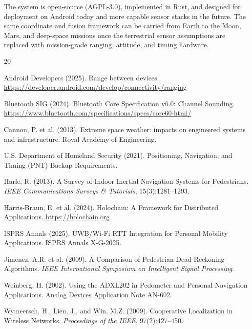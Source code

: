 \documentclass[12pt,a4paper]{article}
\begin{document}
The system is open-source (AGPL-3.0), implemented in Rust, and designed for deployment on Android today and more capable sensor stacks in the future. The same coordinate and fusion framework can be carried from Earth to the Moon, Mars, and deep-space missions once the terrestrial sensor assumptions are replaced with mission-grade ranging, attitude, and timing hardware.



\begin{thebibliography}{20}

Android Developers (2025).
\newblock Range between devices.
\newblock \url{https://developer.android.com/develop/connectivity/ranging}

Bluetooth SIG (2024).
\newblock Bluetooth Core Specification v6.0: Channel Sounding.
\newblock \url{https://www.bluetooth.com/specifications/specs/core60-html/}

Cannon, P. et al. (2013).
\newblock Extreme space weather: impacts on engineered systems and infrastructure.
\newblock Royal Academy of Engineering.

U.S. Department of Homeland Security (2021).
\newblock Positioning, Navigation, and Timing (PNT) Backup Requirements.

Harle, R. (2013).
\newblock A Survey of Indoor Inertial Navigation Systems for Pedestrians.
\newblock \emph{IEEE Communications Surveys \& Tutorials}, 15(3):1281--1293.

Harris-Braun, E. et al. (2024).
\newblock Holochain: A Framework for Distributed Applications.
\newblock \url{https://holochain.org}

ISPRS Annals (2025).
\newblock UWB/Wi-Fi RTT Integration for Personal Mobility Applications.
\newblock ISPRS Annals X-G-2025.

Jimenez, A.R. et al. (2009).
\newblock A Comparison of Pedestrian Dead-Reckoning Algorithms.
\newblock \emph{IEEE International Symposium on Intelligent Signal Processing}.

Weinberg, H. (2002).
\newblock Using the ADXL202 in Pedometer and Personal Navigation Applications.
\newblock Analog Devices Application Note AN-602.

Wymeersch, H., Lien, J., and Win, M.Z. (2009).
\newblock Cooperative Localization in Wireless Networks.
\newblock \emph{Proceedings of the IEEE}, 97(2):427--450.

\end{thebibliography}
\end{document}

